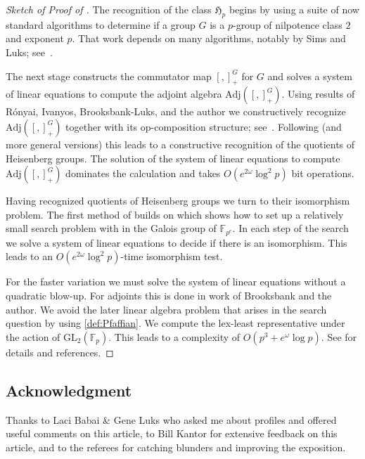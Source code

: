 \documentclass{toc}
\numberwithin{equation}{section}
\theoremstyle{plain}       %
\theoremstyle{remark}
\theoremstyle{definition}
\numberwithin{figure}{section}
\numberwithin{table}{section}
\newcommand{\bbF}{\mathbb{F}}  %
\begin{document}
\begin{proof}[Sketch of Proof of ]
The recognition of the class $\mathfrak{H}_p$ begins by using a suite of now
standard algorithms to determine if a group $G$ is a $p$-group of nilpotence
class $2$ and exponent $p$.  That work depends on many algorithms, notably
by Sims and Luks; see~\cite{Seress}.  
	
The next stage constructs the commutator map $[,]_+^G$ for $G$ and solves a
system of linear equations to compute the adjoint algebra
$\mathrm{Adj}([,]_+^G)$.  Using results of
%
R\'onyai,  %
Ivanyos, Brooksbank-Luks,
and the author we constructively recognize $\mathrm{Adj}([,]_+^G)$ together
with its op-composition structure; 
%
see~\cite{LW, BW:autotopism}.    %
Following
 (and more general versions) this leads
to a constructive recognition of the quotients of Heisenberg groups.
The solution of the system of linear equations to compute
$\mathrm{Adj}([,]_+^G)$ dominates the calculation and takes
$O(e^{2\omega}\log^2 p)$ bit operations.
	
Having recognized quotients of Heisenberg groups we turn to their
isomorphism problem.  The first method of \cite{LW} builds on
 which shows how to set up a relatively small
search problem with in the Galois group of $\bbF_{p^e}$. In each step of the
search we solve a system of linear equations to decide if there is an
isomorphism.  This leads to an $O(e^{2\omega}\log^2 p)$-time isomorphism
test.

For the faster variation we must solve the system of linear equations
without a quadratic blow-up.  For adjoints this is done in work of
Brooksbank and the author.  We avoid the later linear algebra problem that
arises in the search question by using \eqref{def:Pfaffian}.  We compute the
lex-least representative under the action of $\mathrm{GL}_2(\bbF_p)$.  This
leads to a complexity of $O(p^3+e^{\omega}\log p)$.  See \cite{BMW} for
details and references.
\end{proof}

%
%
%
%
%
%
%
%
%
%
%
%
%
%
%
%
%
%
%
%
%
%
%
%
%
%
%
%
%
%
%
%
%
%
%
%
%
%
%
%
%
%
%
%
%
%
%
%
%
%
%
%
%
%
%
%
%
%
%
%
%
%
%
%
%
%
%
%
%
%
%
%
%
%
%
%
%
%
%
%
%

%
%
%
%
%
%
%
%

%



\subsection*{Acknowledgment}
Thanks to Laci Babai \& Gene Luks who asked me about profiles and offered useful
comments on this article, to Bill Kantor for extensive feedback on this article,
and to the referees for catching blunders and improving the exposition.
\end{document}
